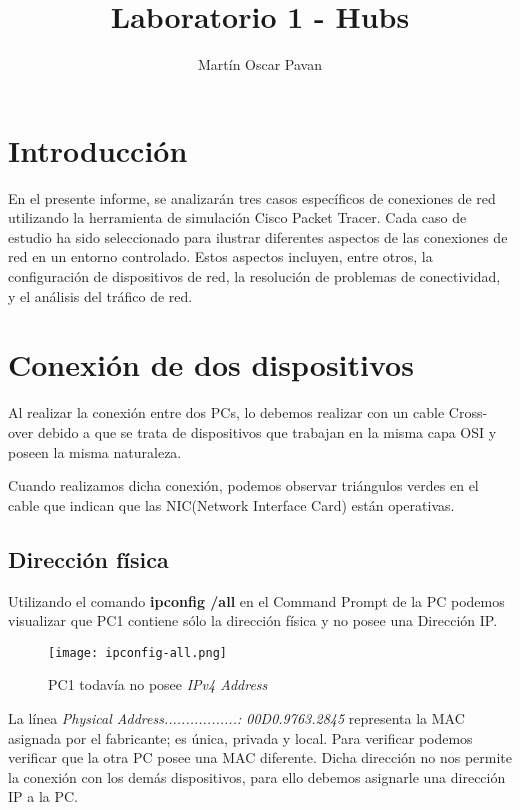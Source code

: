 \documentclass{article}
\title{Laboratorio 1 - Hubs}
\author{Martín Oscar Pavan}
\begin{document}
\maketitle

\section{Introducción}

En el presente informe, se analizarán tres casos específicos de conexiones de red utilizando la herramienta de simulación Cisco Packet Tracer.
Cada caso de estudio ha sido seleccionado para ilustrar diferentes aspectos de las conexiones de red en un entorno controlado. Estos aspectos incluyen, entre otros, la configuración de dispositivos de red, la resolución de problemas de conectividad, y el análisis del tráfico de red.

\section{Conexión de dos dispositivos}
Al realizar la conexión entre dos PCs, lo debemos realizar con un cable Cross-over debido a que se trata de dispositivos que trabajan en la misma capa OSI y poseen la misma naturaleza.

Cuando realizamos dicha conexión, podemos observar triángulos verdes en el cable que indican que las NIC(Network Interface Card) están operativas.

\subsection{Dirección física}
Utilizando el comando \textbf{ipconfig /all} en el Command Prompt de la PC podemos visualizar que PC1 contiene sólo la dirección física y no posee una Dirección IP.

\begin{figure}[H]
\centering
\texttt{[image: ipconfig-all.png]}
\caption{\label{fig:ipconfig-all} PC1 todavía no posee \textit{IPv4 Address}}
\end{figure}

La línea \textit{Physical Address.................: 00D0.9763.2845} representa la MAC asignada por el fabricante; es única, privada y local. Para verificar podemos verificar que la otra PC posee una MAC diferente. Dicha dirección no nos permite la conexión con los demás dispositivos, para ello debemos asignarle una dirección IP a la PC.
\end{document}
